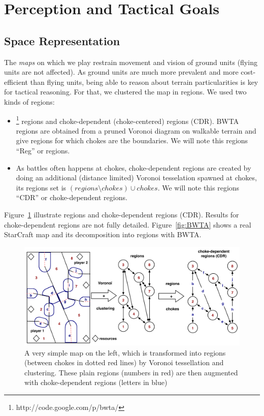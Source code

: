 \section{Perception and Tactical Goals}
\subsection{Space Representation}
The \textit{maps} on which we play restrain movement and vision of ground units (flying units are not affected). As ground units are much more prevalent and more cost-efficient than flying units, being able to reason about terrain particularities is key for tactical reasoning. For that, we clustered the map in regions. 
We used two kinds of regions: 
\begin{itemize}
    \item {}\footnote{http://code.google.com/p/bwta/} regions and choke-dependent (choke-centered) regions (CDR). BWTA regions are obtained from a pruned Voronoi diagram on walkable terrain \citep{Perkins2010} and give regions for which chokes are the boundaries. We will note this regions ``Reg'' or regions.
    \item As battles often happens at chokes, choke-dependent regions are created by doing an additional (distance limited) Voronoi tesselation spawned at chokes, its regions set is $(regions \setminus chokes) \cup chokes$. We will note this regions ``CDR'' or choke-dependent regions.
\end{itemize}
Figure~\ref{fig:terrainanalysis} illustrate regions and choke-dependent regions (CDR). Results for choke-dependent regions are not fully detailed. Figure~\ref{fig:BWTA} shows a real StarCraft map and its decomposition into regions with BWTA.

\begin{figure}[!h]
\begin{center}
\includegraphics[width=0.99\columnwidth]{images/terrain_analysis.png}
\caption{A very simple map on the left, which is transformed into regions (between chokes in dotted red lines) by Voronoi tessellation and clustering. These plain regions (numbers in red) are then augmented with choke-dependent regions (letters in blue)}%
\label{fig:terrainanalysis}
\end{center}
\end{figure}

